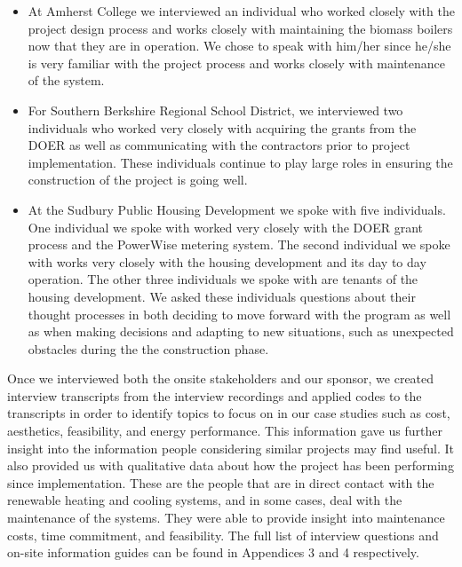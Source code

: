     \begin{itemize}
      \item{At Amherst College we interviewed an individual who worked closely with the project design process and works closely with maintaining the biomass boilers now that they are in operation. We chose to speak with him/her since he/she is very familiar with the project process and works closely with maintenance of the system.}
      \item{For Southern Berkshire Regional School District, we interviewed two individuals who worked very closely with acquiring the grants from the DOER as well as communicating with the contractors prior to project implementation. These individuals continue to play large roles in ensuring the construction of the project is going well.}
      \item{At the Sudbury Public Housing Development we spoke with five individuals. One individual we spoke with worked very closely with the DOER grant process and the PowerWise metering system. The second individual we spoke with works very closely with the housing development and its day to day operation. The other three individuals we spoke with are tenants of the housing development. We asked these individuals questions about their thought processes in both deciding to move forward with the program as well as when making decisions and adapting to new situations, such as unexpected obstacles during the the construction phase.}
    \end{itemize}
    \par Once we interviewed both the onsite stakeholders and our sponsor, we created interview transcripts from the interview recordings and applied codes to the transcripts in order to identify topics to focus on in our case studies such as cost, aesthetics, feasibility, and energy performance. This information gave us further insight into the information people considering similar projects may find useful. It also provided us with qualitative data about how the project has been performing since implementation. These are the people that are in direct contact with the renewable heating and cooling systems, and in some cases, deal with the maintenance of the systems. They were able to provide insight into maintenance costs, time commitment, and feasibility. The full list of interview questions and on-site information guides can be found in Appendices 3 and 4 respectively. 

